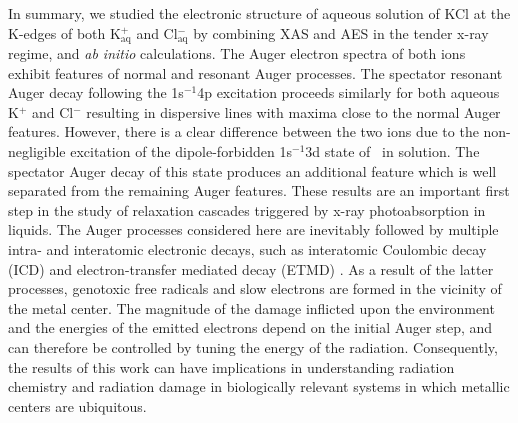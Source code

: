 In summary, we studied the electronic structure of aqueous solution of KCl at the K-edges of both K$^{+}_{\text{aq}}$ and Cl$^{-}_{\text{aq}}$ by combining XAS and AES in the tender x-ray regime, and {\it ab initio} calculations. The Auger electron spectra of both ions exhibit features of normal and resonant Auger processes. The spectator resonant Auger decay following the 1s$^{-1}$4p excitation proceeds similarly for both aqueous K$^{+}$ and Cl$^{-}$ resulting in dispersive lines with maxima close to the normal Auger features. However, there is a clear difference between the two ions due to the non-negligible excitation of the dipole-forbidden 1s$^{-1}$3d state of \ki~in solution. The spectator Auger decay of this state produces an additional feature which is well separated from the remaining Auger features. These results are an important first step in the study of relaxation cascades triggered by x-ray photoabsorption in liquids. The Auger processes considered here are inevitably followed by multiple intra- and interatomic electronic decays, such as interatomic Coulombic decay (ICD) and electron-transfer mediated decay (ETMD) \citep{unger17:708,Stumpf16:237}. As a result of the latter processes, genotoxic free radicals and slow electrons are formed in the vicinity of the metal center. The magnitude of the damage inflicted upon the environment and the energies of the emitted electrons depend on the initial Auger step, and can therefore be controlled by tuning the energy of the radiation. Consequently, the results of this work can have implications in understanding radiation chemistry and radiation damage in biologically relevant systems in which metallic centers are ubiquitous.